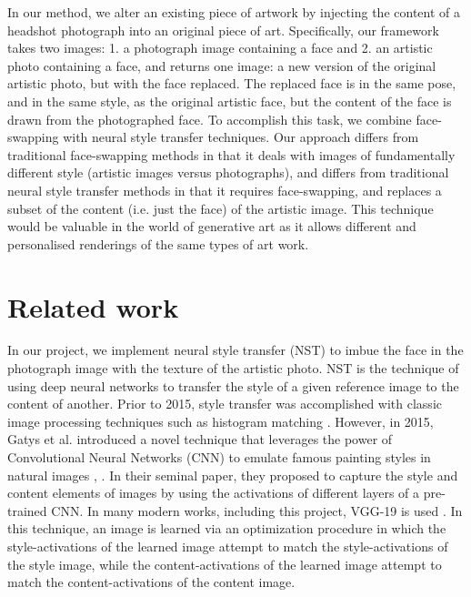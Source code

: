 \documentclass{article}
\begin{document}
In our method, we alter an existing piece of artwork by injecting the content of a headshot photograph into an original piece of art. Specifically, our framework takes two images: 1. a photograph image containing a face and 2. an artistic photo containing a face, and returns one image: a new version of the original artistic photo, but with the face replaced. The replaced face is in the same pose, and in the same style, as the original artistic face, but the content of the face is drawn from the photographed face. To accomplish this task, we combine face-swapping with neural style transfer techniques. Our approach differs from traditional face-swapping methods in that it deals with images of fundamentally different style (artistic images versus photographs), and differs from traditional neural style transfer methods in that it requires face-swapping, and replaces a subset of the content (i.e. just the face) of the artistic image. This technique would be valuable in the world of generative art as it allows different and personalised renderings of the same types of art work. 

\section{Related work}

In our project, we implement neural style transfer (NST) to imbue the face in the photograph image with the texture of the artistic photo. NST is the technique of using deep neural networks to transfer the style of a given reference image to the content of another. Prior to 2015, style transfer was accomplished with classic image processing techniques such as histogram matching \cite{neumann2005color}. However, in 2015, Gatys et al. introduced a novel technique that leverages the power of Convolutional Neural Networks (CNN) to emulate famous painting styles in natural images \cite{gatys2015neural}, \cite{gatys2016}. In their seminal paper, they proposed to capture the style and content elements of images by using the activations of different layers of a pre-trained CNN. In many modern works, including this project, VGG-19 is used \cite{Simonyan14c}. In this technique, an image is learned via an optimization procedure in which the style-activations of the learned image attempt to match the style-activations of the style image, while the content-activations of the learned image attempt to match the content-activations of the content image. 
\end{document}
